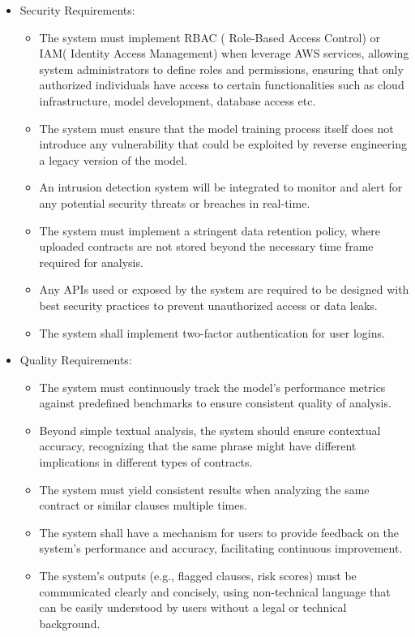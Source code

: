 \begin{itemize}
\begin{itemize}
    \end{itemize}
    \item Security Requirements: 
    \begin{itemize}
        \item The system must implement RBAC ( Role-Based Access Control) or IAM( Identity Access Management) when leverage AWS services, allowing system administrators to define roles and permissions, ensuring that only authorized individuals have access to certain functionalities such as cloud infrastructure, model development, database access etc. 
        \item The system must ensure that the model training process itself does not introduce any vulnerability that could be exploited by reverse engineering a legacy version of the model. 
        \item An intrusion detection system will be integrated to monitor and alert for any potential security threats or breaches in real-time.
        \item The system must implement a stringent data retention policy, where uploaded contracts are not stored beyond the necessary time frame required for analysis.
        \item Any APIs used or exposed by the system are required to be designed with best security practices to prevent unauthorized access or data leaks.
        \item The system shall implement two-factor authentication for user logins.












    \end{itemize}
    \item Quality Requirements: 
    \begin{itemize}
        \item The system must continuously track the model’s performance metrics against predefined benchmarks to ensure consistent quality of analysis.
        \item Beyond simple textual analysis, the system should ensure contextual accuracy, recognizing that the same phrase might have different implications in different types of contracts.
        \item The system must yield consistent results when analyzing the same contract or similar clauses multiple times.
        \item The system shall have a mechanism for users to provide feedback on the system's performance and accuracy, facilitating continuous improvement.
        \item The system's outputs (e.g., flagged clauses, risk scores) must be communicated clearly and concisely, using non-technical language that can be easily understood by users without a legal or technical background.














\end{itemize}
\end{itemize}
